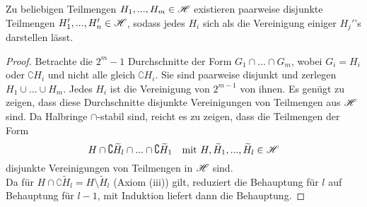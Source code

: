 \begin{lemma}
\begin{mdframed}
Zu beliebigen Teilmengen $H_1,...,H_m \in \mathscr{H}$ existieren paarweise disjunkte Teilmengen $H_1',...,H_n' \in \mathscr{H}$, sodass jedes $H_i$ sich als die Vereinigung einiger $H_j'$'s darstellen lässt.
 \label{lemmaA}
\end{mdframed}
\begin{proof}
Betrachte die $2^m-1$ Durchschnitte der Form $G_1 \cap ... \cap G_m$, wobei $G_i = H_i$ oder $\complement H_i$ und nicht alle gleich $\complement H_i$. Sie sind paarweise disjunkt und zerlegen $H_1 \cup ... \cup H_m$. Jedes $H_i$ ist die Vereinigung von $2^{m-1}$ von ihnen. Es genügt zu zeigen, dass diese Durchschnitte disjunkte Vereinigungen von Teilmengen aus $\mathscr{H}$ sind. Da Halbringe $\cap$-stabil sind, reicht es zu zeigen, dass die Teilmengen der Form
\begin{equation*}
H \cap \complement \widetilde{H}_l \cap ... \cap \complement \widetilde{H}_1	\quad \text{mit }H,\widetilde{H}_1,...,\widetilde{H}_l \in \mathscr{H}
\end{equation*}
disjunkte Vereinigungen von Teilmengen in $\mathscr{H}$ sind. \\
Da für $H \cap \complement \widetilde{H}_l = H \setminus \widetilde{H}_l$ (Axiom (iii)) gilt, reduziert die Behauptung für $l$ auf Behauptung für $l-1$, mit Induktion liefert dann die Behauptung.
\end{proof}
\end{lemma}

